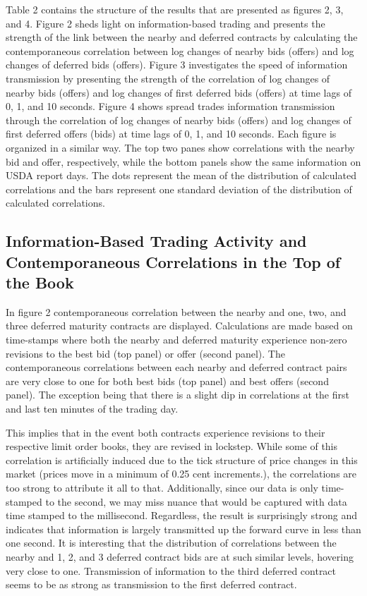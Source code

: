 \documentclass[review,12pt]{elsarticle}
\begin{document}
\begin{linenumbers}
Table 2 contains the structure of the results that are presented as
figures 2, 3, and 4. Figure 2 sheds light on information-based trading
and presents the strength of the link between the nearby and deferred
contracts by calculating the contemporaneous correlation between log
changes of nearby bids (offers) and log changes of deferred bids
(offers). Figure 3 investigates the speed of information transmission by
presenting the strength of the correlation of log changes of nearby bids
(offers) and log changes of first deferred bids (offers) at time lags of
0, 1, and 10 seconds. Figure 4 shows spread trades information
transmission through the correlation of log changes of nearby bids
(offers) and log changes of first deferred offers (bids) at time lags of
0, 1, and 10 seconds. Each figure is organized in a similar way. The top
two panes show correlations with the nearby bid and offer, respectively,
while the bottom panels show the same information on USDA report days.
The dots represent the mean of the distribution of calculated
correlations and the bars represent one standard deviation of the
distribution of calculated correlations.

\subsection{Information-Based Trading Activity and Contemporaneous
Correlations in the Top of the
Book}\label{information-based-trading-activity-and-contemporaneous-correlations-in-the-top-of-the-book-1}

In figure 2 contemporaneous correlation between the nearby and one, two,
and three deferred maturity contracts are displayed. Calculations are
made based on time-stamps where both the nearby and deferred maturity
experience non-zero revisions to the best bid (top panel) or offer
(second panel). The contemporaneous correlations between each nearby and
deferred contract pairs are very close to one for both best bids (top
panel) and best offers (second panel). The exception being that there is
a slight dip in correlations at the first and last ten minutes of the
trading day.

This implies that in the event both contracts experience revisions to
their respective limit order books, they are revised in lockstep. While
some of this correlation is artificially induced due to the tick
structure of price changes in this market (prices move in a minimum of
0.25 cent increments.), the correlations are too strong to attribute it
all to that. Additionally, since our data is only time-stamped to the
second, we may miss nuance that would be captured with data time stamped
to the millisecond. Regardless, the result is surprisingly strong and
indicates that information is largely transmitted up the forward curve
in less than one second. It is interesting that the distribution of
correlations between the nearby and 1, 2, and 3 deferred contract bids
are at such similar levels, hovering very close to one. Transmission of
information to the third deferred contract seems to be as strong as
transmission to the first deferred contract.


\end{linenumbers}
\end{document}
